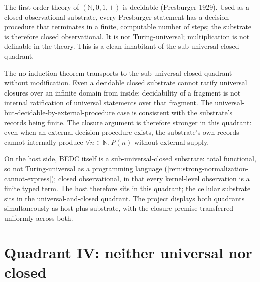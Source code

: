 \begin{example}
\label{ex:quadrant-presburger-as-substrate}
The first-order theory of $(\mathbb{N}, 0, 1, +)$ is decidable (Presburger 1929). Used as a closed observational substrate, every Presburger statement has a decision procedure that terminates in a finite, computable number of steps; the substrate is therefore closed observational. It is not Turing-universal; multiplication is not definable in the theory. This is a clean inhabitant of the sub-universal-closed quadrant.
\end{example}

\begin{principle}
\label{prin:quadrant-closure-plus-subuniversality-keeps-no-induction}
The no-induction theorem transports to the sub-universal-closed quadrant without modification. Even a decidable closed substrate cannot ratify universal closures over an infinite domain from inside; decidability of a fragment is not internal ratification of universal statements over that fragment. The universal-but-decidable-by-external-procedure case is consistent with the substrate's records being finite. The closure argument is therefore stronger in this quadrant: even when an external decision procedure exists, the substrate's own records cannot internally produce $\forall n \in \mathbb{N}.\, P(n)$ without external supply.
\end{principle}

\begin{remark}
\label{rem:quadrant-bedc-kernel-as-subuniversal-closed}
On the host side, BEDC itself is a sub-universal-closed substrate: total functional, so not Turing-universal as a programming language (\autoref{rem:strong-normalization-cannot-express}); closed observational, in that every kernel-level observation is a finite typed term. The host therefore sits in this quadrant; the cellular substrate sits in the universal-and-closed quadrant. The project displays both quadrants simultaneously as host plus substrate, with the closure premise transferred uniformly across both.
\end{remark}

\section{Quadrant IV: neither universal nor closed}
\label{sec:quadrant-degenerate}

